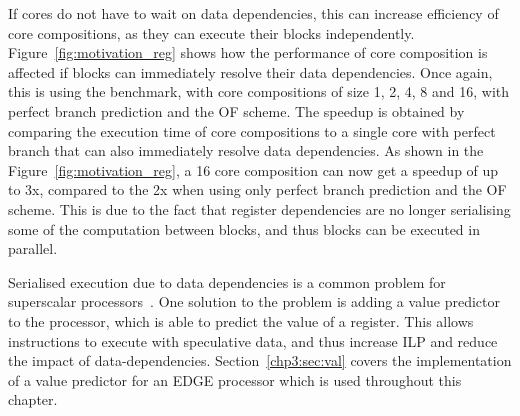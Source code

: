 If cores do not have to wait on data dependencies, this can increase efficiency of core compositions, as they can execute their blocks independently.
Figure~\ref{fig:motivation_reg} shows how the performance of core composition is affected if blocks can immediately resolve their data dependencies.
Once again, this is using the  benchmark, with core compositions of size 1, 2, 4, 8 and 16, with perfect branch prediction and the OF scheme.
The speedup is obtained by comparing the execution time of core compositions to a single core with perfect branch that can also immediately resolve data dependencies.
As shown in the Figure~\ref{fig:motivation_reg}, a 16 core composition can now get a speedup of up to 3x, compared to the 2x when using only perfect branch prediction and the OF scheme.
This is due to the fact that register dependencies are no longer serialising some of the computation between blocks, and thus blocks can be executed in parallel.

Serialised execution due to data dependencies is a common problem for superscalar processors~\cite{peraisVTAGE2014}.
One solution to the problem is adding a value predictor to the processor, which is able to predict the value of a register.
This allows instructions to execute with speculative data, and thus increase ILP and reduce the impact of data-dependencies.
Section~\ref{chp3:sec:val} covers the implementation of a value predictor for an EDGE processor which is used throughout this chapter.






